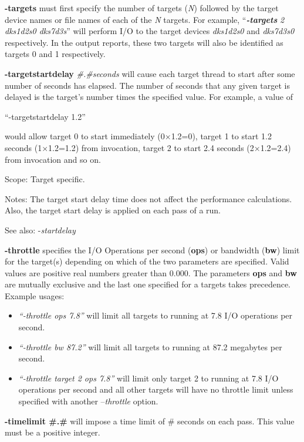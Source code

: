 \textbf{-targets} must first specify the number of targets (\emph{N}) followed by the target device names or file names of each of the \emph{N} targets. For example, ``\emph{\textbf{-targets}} \emph{2 dks1d2s0 dks7d3s}'' will perform I/O to the target devices \emph{dks1d2s0} and \emph{dks7d3s0} respectively. In the output reports, these two targets will also be identified as targets 0 and 1 respectively.

\textbf{-targetstartdelay} \emph{\#.\#seconds} will cause each target thread to start after some number of seconds has elapsed. The number of seconds that any given target is delayed is the target's number times the specified value. For example, a value of

``-targetstartdelay 1.2''

would allow target 0 to start immediately (0×1.2=0), target 1 to start 1.2 seconds (1×1.2=1.2) from invocation, target 2 to start 2.4 seconds (2×1.2=2.4) from invocation and so on.

Scope: Target specific.

Notes: The target start delay time does not affect the performance calculations. Also, the target start delay is applied on each pass of a run.

See also: -\emph{startdelay}

\textbf{-throttle} specifies the I/O Operations per second (\textbf{ops}) or bandwidth (\textbf{bw}) limit for the target(s) depending on which of the two parameters are specified. Valid values are positive real numbers greater than 0.000. The parameters \textbf{ops} and \textbf{bw} are mutually exclusive and the last one specified for a targets takes precedence. Example usages:

\begin{itemize}
\item
  \emph{``-throttle ops 7.8''} will limit all targets to running at 7.8 I/O operations per second.
\item
  \emph{``-throttle bw 87.2''} will limit all targets to running at 87.2 megabytes per second.
\item
  \emph{``-throttle target 2 ops 7.8''} will limit only target 2 to running at 7.8 I/O operations per second and all other targets will have no throttle limit unless specified with another --\emph{throttle} option.
\end{itemize}

\textbf{-timelimit \#.\#} will impose a time limit of \# seconds on each pass. This value must be a positive integer.

